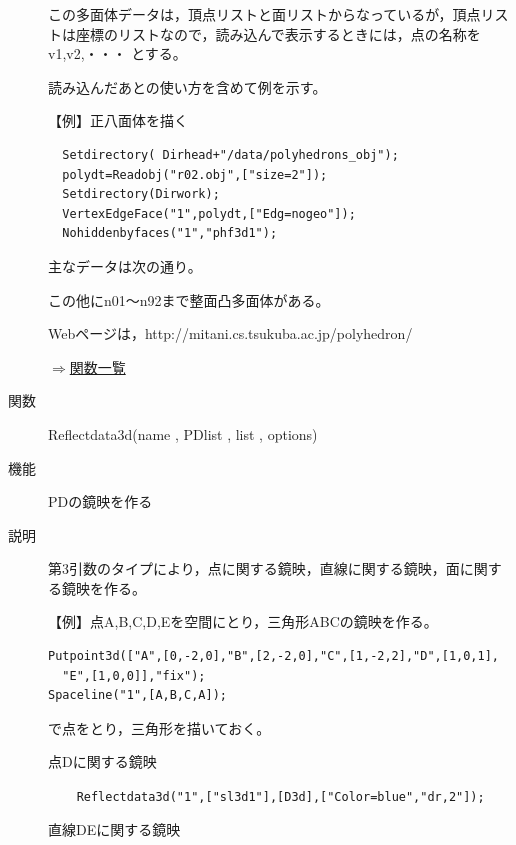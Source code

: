 \documentclass[papersize,a4paper,12pt,uplatex]{jsarticle}
\begin{document}
\begin{description}
この多面体データは，頂点リストと面リストからなっているが，頂点リストは座標のリストなので，読み込んで表示するときには，点の名称を v1,v2,・・・ とする。

読み込んだあとの使い方を含めて例を示す。

\vspace{\baselineskip}
【例】正八面体を描く
\begin{verbatim}
  Setdirectory( Dirhead+"/data/polyhedrons_obj");
  polydt=Readobj("r02.obj",["size=2"]);
  Setdirectory(Dirwork);
  VertexEdgeFace("1",polydt,["Edg=nogeo"]);
  Nohiddenbyfaces("1","phf3d1");
\end{verbatim}
 \begin{center}  \end{center}

主なデータは次の通り。

\vspace{\baselineskip}
  

この他にn01〜n92まで整面凸多面体がある。

Webページは，http://mitani.cs.tsukuba.ac.jp/polyhedron/


\begin{flushright} \hyperlink{functionlist}{$\Rightarrow$関数一覧}\end{flushright}

\hypertarget{reflectdata3d}{}
\item[関数]  Reflectdata3d(name , PDlist , list , options)
\item[機能]  PDの鏡映を作る
\item[説明]  第3引数のタイプにより，点に関する鏡映，直線に関する鏡映，面に関する鏡映を作る。

\vspace{\baselineskip}
【例】点A,B,C,D,Eを空間にとり，三角形ABCの鏡映を作る。

\begin{verbatim}
Putpoint3d(["A",[0,-2,0],"B",[2,-2,0],"C",[1,-2,2],"D",[1,0,1],
  "E",[1,0,0]],"fix");
Spaceline("1",[A,B,C,A]);
\end{verbatim}

で点をとり，三角形を描いておく。

点Dに関する鏡映

 \verb|    Reflectdata3d("1",["sl3d1"],[D3d],["Color=blue","dr,2"]);|

\hspace{20mm} 

直線DEに関する鏡映 


\end{description}
\end{document}
